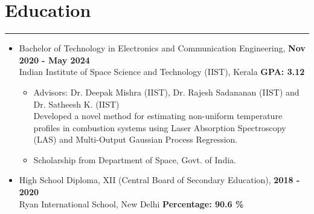 \documentclass[11pt]{article}
\newlength{\sectionvspace}
\newlength{\sectionvspacee}
\begin{document}
	\section*{\bf Education}
	\vspace{\sectionvspace}
	\rule{\textwidth}{0.4pt}
	\begin{itemize}[leftmargin=*,noitemsep,topsep=0pt]
		\item Bachelor of Technology in Electronics and Communication Engineering, \hfill \textbf{Nov 2020 - May 2024} \\
		Indian Institute of Space Science and Technology (IIST), Kerala \hfill \textbf{GPA: 3.12}
		\begin{itemize}[leftmargin=*,noitemsep,topsep=0pt]
			
			\item 	Advisors: Dr. Deepak Mishra (IIST), Dr. Rajesh Sadananan (IIST) and Dr. Satheesh K. (IIST) \\
			Developed a novel method for estimating non-uniform temperature profiles in combustion systems using Laser Absorption Spectroscopy (LAS) and Multi-Output Gaussian Process Regression.
			\item Scholarship from Department of Space, Govt. of India.
		\end{itemize}
		\item High School Diploma, XII (Central Board of Secondary Education), \hfill \textbf{2018 - 2020}\\
		Ryan International School, New Delhi   \hfill \textbf{Percentage: 90.6 \%}
	\end{itemize}
	
		\vspace{\sectionvspacee}
\end{document}
